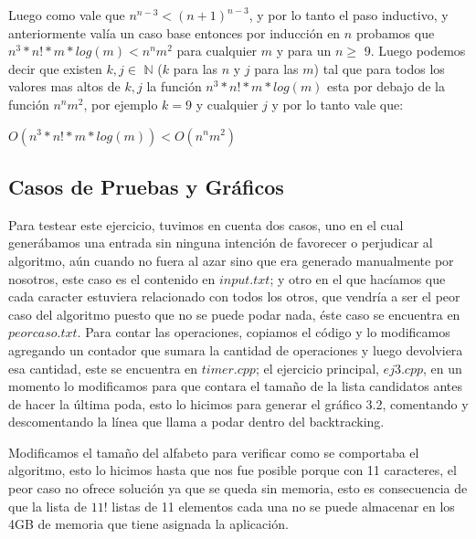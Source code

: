 \documentclass[a4paper, 10pt]{article}
\begin{document}
Luego como vale que $n^{n-3} < (n+1)^{n-3}$, y por lo tanto el paso inductivo, y anteriormente valía un caso base entonces por inducción en $n$ probamos que $n^3*n!*m*log(m) < n^n m^2$ para cualquier $m$ y para un $n\geq$ 9.
Luego podemos decir que existen $k,j \in$ $\mathbb{N}$ ($k$ para las $n$ y $j$ para las $m$) tal que para todos los valores mas altos de $k,j$ la función $n^3*n!*m*log(m)$ esta por debajo de la función $n^n m^2$, por ejemplo $k=9$ y cualquier $j$ y por lo tanto vale que:

\begin{center}
$O(n^3*n!*m*log(m)) < O(n^n m^2)$
\end{center}


\subsection{Casos de Pruebas y Gráficos}

Para testear este ejercicio, tuvimos en cuenta dos casos, uno en el cual generábamos una entrada sin ninguna intención de favorecer o perjudicar al algoritmo, aún cuando no fuera al azar sino que era generado manualmente por nosotros, este caso es el contenido en $input.txt$; y otro en el que hacíamos que cada caracter estuviera relacionado con todos los otros, que vendría a ser el peor caso del algoritmo puesto que no se puede podar nada, éste caso se encuentra en $peorcaso.txt$. Para contar las operaciones, copiamos el código y lo modificamos agregando un contador que sumara la cantidad de operaciones y luego devolviera esa cantidad, este se encuentra en $timer.cpp$; el ejercicio principal, $ej3.cpp$, en un momento lo modificamos para que contara el tamaño de la lista candidatos antes de hacer la última poda, esto lo hicimos para generar el gráfico 3.2, comentando y descomentando la línea que llama a podar dentro del backtracking.

Modificamos el tamaño del alfabeto para verificar como se comportaba el algoritmo, esto lo hicimos hasta que nos fue posible porque con 11 caracteres, el peor caso no ofrece solución ya que se queda sin memoria, esto es consecuencia de que la lista de $11!$ listas de 11 elementos cada una no se puede almacenar en los 4GB de memoria que tiene asignada la aplicación.
\end{document}
